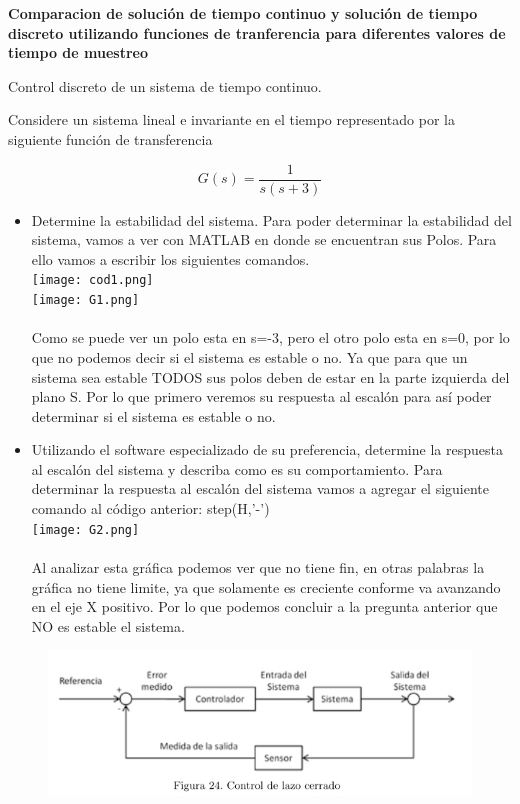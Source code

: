 \textbf{Comparacion de solución de tiempo continuo y solución de tiempo discreto utilizando funciones de tranferencia para diferentes valores de tiempo de muestreo }

{\Large Control discreto de un sistema de tiempo continuo.}

Considere un sistema lineal e invariante en el tiempo representado por la siguiente función de transferencia

\begin{equation*}
	G(s)=\frac{1}{s(s+3)}
\end{equation*}

\begin{itemize}
	\item Determine la estabilidad del sistema.
Para poder determinar la estabilidad del sistema, vamos a ver con MATLAB en donde se encuentran sus Polos. Para ello vamos a escribir los siguientes comandos.\\
\texttt{[image: cod1.png]}\\
\texttt{[image: G1.png]}\\ \\
Como se puede ver un polo esta en s=-3, pero el otro polo esta en s=0, por lo que no podemos decir si el sistema es estable o no. Ya que para que un sistema sea estable TODOS sus polos deben de estar en la parte izquierda del plano S. Por lo que primero veremos su respuesta al escalón para así poder determinar si el sistema es estable o no.

	\item Utilizando el software especializado de su preferencia, determine la respuesta al escalón del sistema y describa como es su comportamiento.
Para determinar la respuesta al escalón del sistema vamos a agregar el siguiente comando al código anterior: step(H,'-')\\
\texttt{[image: G2.png]} \\ \\
Al analizar esta gráfica podemos ver que no tiene fin, en otras palabras la gráfica no tiene limite, ya que solamente es creciente conforme va avanzando en el eje X positivo. Por lo que podemos concluir a la pregunta anterior que NO es estable el sistema.

\end{itemize}

\begin{figure}[H]
	\centering
	\includegraphics[scale=0.7]{img2/fig24}
	\label{fig:fig24}
\end{figure}

